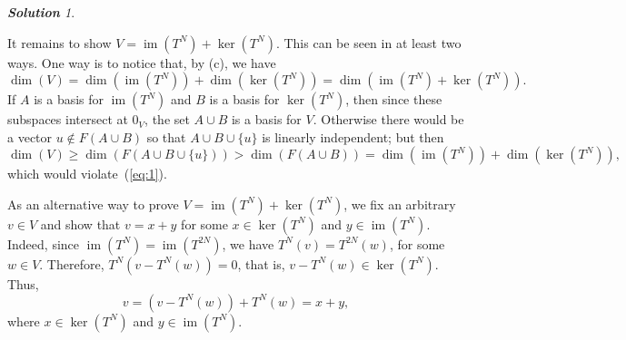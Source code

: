 \documentclass[11pt]{paper}
\theoremstyle{remark}
\newtheorem*{solution}{{\bf Solution}}
\newcommand\0{\ensuremath{\mathbf{0}}}
\newcommand{\<}{\ensuremath{\langle}}
\renewcommand{\>}{\ensuremath{\rangle}}
\renewcommand{\ker}[1]{\ensuremath{\operatorname{ker}(#1)}}
\renewcommand{\dim}[1]{\ensuremath{\operatorname{dim}(#1)}}
\newcommand\im[1]{\ensuremath{\operatorname{im}(#1)}}
\renewcommand{\geq}{\ensuremath{\geqslant}}
\begin{document}
\begin{solution}
\begin{enumerate}[(a)]
It remains to show $V = \im{T^N} +
\ker{T^N}$. This can be seen in at least two ways.
One way is to notice that, by (c), we have 
\begin{equation}
  \label{eq:1}
\dim{V} = \dim{\im{T^N}} +\dim{\ker{T^N}} = \dim{\im{T^N} + \ker{T^N}}.
\end{equation}
If $A$ is a basis for $\im{T^N}$ and $B$ is a basis for $\ker{T^N}$, then since
these subspaces intersect at $0_V$, the set $A\cup B$ is a basis for
$V$. Otherwise there would be a vector $u\notin F(A\cup B)$ so that
$A\cup B \cup\{u\}$ is linearly independent; but then
\[
\dim{V} \geq \dim{F(A\cup B \cup\{u\})} > \dim{F(A\cup B)} =
 \dim{\im{T^N}} +\dim{\ker{T^N}},
\]
which would violate~(\ref{eq:1}).

As an alternative way to prove $V = \im{T^N} + \ker{T^N}$, we fix an arbitrary
$v \in V$ and show that $v = x + y$ for some $x \in \ker{T^N}$ and 
$y\in \im{T^N}$. Indeed, since $\im{T^N} = \im{T^{2N}}$, we have 
$T^N(v) =T^{2N}(w)$, for some $w \in V$.  Therefore, 
$T^N(v - T^N(w)) = 0$, that is,
$v - T^N(w) \in \ker{T^N}$.  Thus,
\[
v = (v - T^N(w)) + T^N(w) =  x + y,
\]
where $x \in \ker{T^N}$ and $y\in \im{T^N}$.
  \end{enumerate}
\end{solution}
\probskip
\end{document}
